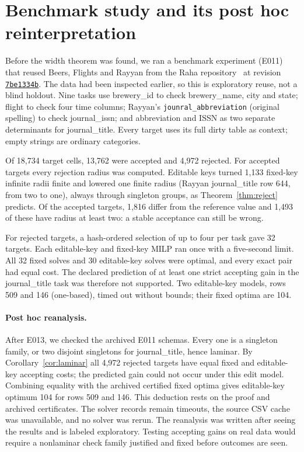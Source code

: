 \documentclass[11pt]{article}
\theoremstyle{remark}
\begin{document}
\section{Benchmark study and its post hoc reinterpretation}
Before the width theorem was found, we ran a benchmark experiment (E011) that
reused Beers, Flights and Rayyan from the Raha
repository~\cite{raha} at revision
\href{https://github.com/BigDaMa/raha/tree/7be1334b8c7bbdac3f47ef514fb3e1e8c5fc181c}{\texttt{7be1334b}}.
The data had been inspected earlier, so this is exploratory reuse, not a blind
holdout. Nine tasks use brewery\_id to check brewery\_name, city and state;
flight to check four time columns; Rayyan's \texttt{jounral\_abbreviation}
(original spelling) to check journal\_issn; and abbreviation and ISSN as two
separate determinants for journal\_title. Every target uses its full dirty
table as context; empty strings are ordinary categories.

Of 18,734 target cells, 13,762 were accepted and 4,972 rejected. For accepted
targets every rejection radius was computed. Editable keys turned 1,133
fixed-key infinite radii finite and lowered one finite radius (Rayyan
journal\_title row 644, from two to one), always through singleton groups, as
Theorem~\ref{thm:reject} predicts. Of the accepted targets, 1,816 differ from
the reference value and 1,493 of these have radius at least two: a stable
acceptance can still be wrong.

For rejected targets, a hash-ordered selection of up to four per task gave 32
targets. Each editable-key and fixed-key MILP ran once with a five-second limit.
All 32 fixed solves and 30 editable-key solves were optimal, and every exact
pair had equal cost. The declared prediction of at least one strict accepting
gain in the journal\_title task was therefore not supported. Two editable-key
models, rows 509 and 146 (one-based), timed out without bounds; their fixed
optima are 104.

\paragraph{Post hoc reanalysis.}
After E013, we checked the archived E011 schemas. Every one is a singleton
family, or two disjoint singletons for journal\_title, hence laminar. By
Corollary~\ref{cor:laminar} all 4,972 rejected targets have equal fixed and
editable-key accepting costs; the predicted gain could not occur under this edit
model. Combining equality with the archived certified fixed optima gives
editable-key optimum 104 for rows 509 and 146. This deduction rests on the
proof and archived certificates. The solver records remain timeouts, the source
CSV cache was unavailable, and no solver was rerun. The reanalysis was
written after seeing the results and is labeled exploratory. Testing
accepting gains on real data would require a nonlaminar check family justified
and fixed before outcomes are seen.
\end{document}
